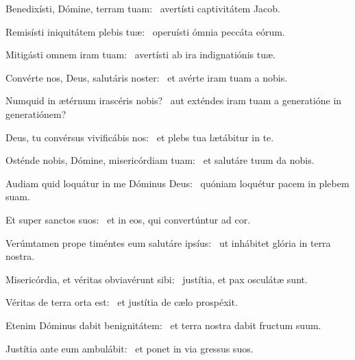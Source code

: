 \item Benedixísti, Dómine, terram tuam:~\psstar{} avertísti captivitátem Jacob.

\item Remisísti iniquitátem plebis tuæ:~\psstar{} operuísti ómnia peccáta eórum.

\item Mitigásti omnem iram tuam:~\psstar{} avertísti ab ira indignatiónis tuæ.

\item Convérte nos, Deus, salutáris noster:~\psstar{} et avérte iram tuam a nobis.

\item Numquid in ætérnum irascéris nobis?~\psstar{} aut exténdes iram tuam a generatióne in generatiónem?

\item Deus, tu convérsus vivificábis nos:~\psstar{} et plebs tua lætábitur in te.

\item Osténde nobis, Dómine, misericórdiam tuam:~\psstar{} et salutáre tuum da nobis.

\item Audiam quid loquátur in me Dóminus Deus:~\psstar{} quóniam loquétur pacem in plebem suam.

\item Et super sanctos suos:~\psstar{} et in eos, qui convertúntur ad cor.

\item Verúmtamen prope timéntes eum salutáre ipsíus:~\psstar{} ut inhábitet glória in terra nostra.

\item Misericórdia, et véritas obviavérunt sibi:~\psstar{} justítia, et pax osculátæ sunt.

\item Véritas de terra orta est:~\psstar{} et justítia de cælo prospéxit.

\item Etenim Dóminus dabit benignitátem:~\psstar{} et terra nostra dabit fructum suum.

\item Justítia ante eum ambulábit:~\psstar{} et ponet in via gressus suos.
